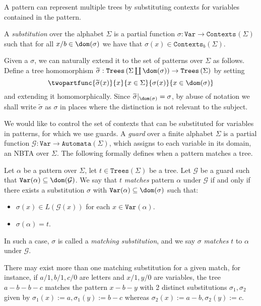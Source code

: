 \documentclass[12pt, a4paper]{article}
\newcommand{\Alphabet}{\ensuremath{\Sigma}}
\newcommand{\Variables}{\texttt{Var}}
\newcommand{\Trees}[1]{\ensuremath{\texttt{Trees}\left(#1\right)}}
\newcommand{\Contexts}[2]{\ensuremath{\texttt{Contexts}_{#2}\left(#1\right)}}
\newcommand{\substitution}{\ensuremath{\sigma}}
\newcommand{\Automata}[1]{\texttt{Automata}(#1)}
\newcommand{\guardFunction}{\ensuremath{\mathcal{G}}}
\newcommand{\guard}[1]{\ensuremath{\guardFunction(#1)}}
\begin{document}
A pattern can represent multiple trees by substituting contexts for variables contained in the pattern.
\begin{definition}[Substitution]\label{def:substitution}
    A \emph{substitution} over the alphabet $\Alphabet$ is a partial function $\substitution : \Variables \to \Contexts{\Alphabet}{}$ such that for all $x/b \in \dom(\substitution)$ we have that $\substitution(x) \in \Contexts{\Alphabet}{b}$.
\end{definition}
 Given a $\substitution$, we can naturally extend it to the set of patterns over $\Alphabet$ as follows. Define a tree homomorphism $\widetilde{\substitution} : \Trees{\Alphabet \coprod \dom(\substitution)} \to \Trees{\Alphabet}$ by setting
\[\twopartfunc{\widetilde{\substitution}(x)}{x}{x \in \Alphabet}{\substitution(x)}{x \in \dom(\substitution)}\]
and extending it homomorphically. Since $\widetilde{\substitution}|_{\dom(\substitution)} = \substitution$, by abuse of notation we shall write $\widetilde{\substitution}$ as $\substitution$ in places where the distinction is not relevant to the subject.

We would like to control the set of contexts that can be substituted for variables in patterns, for which we use guards. A \emph{guard} over a finite alphabet  $\Alphabet$ is a partial function $\guardFunction : \Variables \to \Automata{\Alphabet}$, which assigns to each variable in its domain, an NBTA over $\Alphabet$. The following formally defines when a pattern matches a tree.

\begin{definition}[Match]\label{def:match}
    Let $\alpha$ be a pattern over $\Alphabet$, let $t \in \Trees{\Alphabet}$ be a tree. Let $\guardFunction$ be a guard such that $\Variables(\alpha) \subseteq \dom(\guardFunction)$. We say that $t$ \emph{matches} pattern $\alpha$ under $\guardFunction$ if and only if there exists a substitution $\substitution$ with $\Variables(\alpha) \subseteq \dom(\substitution)$ such that:
    \begin{itemize}
        \item $\substitution(x) \in L(\guard{x})$ for each $x \in \Variables(\alpha)$.
        \item $\substitution(\alpha) = t$.
    \end{itemize}
    In such a case, $\substitution$ is called a \emph{matching substitution}, and we say $\substitution$ \emph{matches} $t$ to $\alpha$ under $\guardFunction$.
\end{definition}
There may exist more than one matching substitution for a given match, for instance, if $a/1, b/1, c/0$ are letters and $x/1, y/0$ are variables, the tree $a-b-b-c$ matches the pattern $x-b-y$ with 2 distinct substitutions $\substitution_1, \substitution_2$ given by $\substitution_1(x) := a, \substitution_1(y) := b-c$ whereas $\substitution_2(x) := a-b, \substitution_2(y) := c$.
\end{document}
